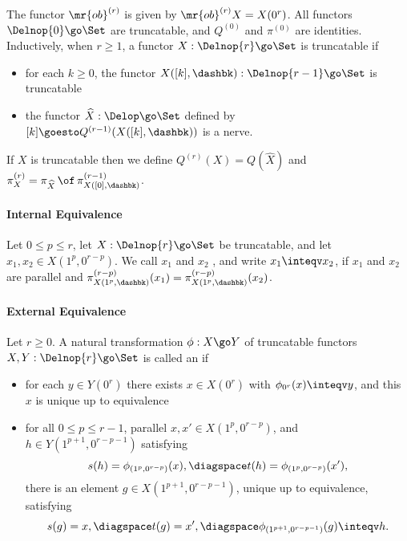The functor $\mr{ob}^{(r)}$ is given by $\mr{ob}^{(r)}X = X(0^r)$.  All
functors $\Delnop{0} \go \Set$ are truncatable, and $Q^{(0)}$ and
$\pi^{(0)}$ are identities.  Inductively, when $r\geq 1$, a functor $X:
\Delnop{r} \go \Set$ is truncatable if 
%
\begin{itemize}
\item for each $k\geq 0$, the functor $X([k],\dashbk): \Delnop{r-1} \go
\Set$ is truncatable 
\item the functor $\widehat{X}: \Delop \go \Set$ defined by $[k] \goesto
Q^{(r-1)}(X([k],\dashbk))$ is a nerve.
\end{itemize}
%
If $X$ is truncatable then we define $Q^{(r)}(X)=Q(\widehat{X})$ and
$\pi^{(r)}_X = \pi_{\widehat{X}} \,\of\, \pi^{(r-1)}_{X([0],\dashbk)}$.




\paragraph{Internal Equivalence}

Let $0\leq p\leq r$, let $X: \Delnop{r} \go \Set$ be truncatable, and let
$x_1,x_2 \in X(1^p, 0^{r-p})$.  We call $x_1$ and $x_2$ ,
and write $x_1\inteqv x_2$, if $x_1$ and $x_2$ are parallel and
$\pi^{(r-p)}_{X(1^p,\dashbk)}(x_1) = \pi^{(r-p)}_{X(1^p,\dashbk)}(x_2)$.

\paragraph{External Equivalence}

Let $r\geq 0$.  A natural transformation $\phi: X \go Y$ of truncatable
functors $X, Y: \Delnop{r} \go \Set$ is called an  if
%
\begin{itemize}
\item 
for each $y\in Y(0^r)$ there exists $x\in X(0^r)$ with $\phi_{0^r}(x)
\inteqv y$, and this $x$ is unique up to equivalence
\item
for all $0 \leq p\leq r-1$, parallel $x, x' \in X(1^p,0^{r-p})$, and $h\in
Y(1^{p+1},0^{r-p-1})$ satisfying
\[
s(h)=\phi_{(1^p,0^{r-p})}(x),	\diagspace 
t(h)=\phi_{(1^p,0^{r-p})}(x'),
\]
there is an element $g\in X(1^{p+1},0^{r-p-1})$, unique up to equivalence,
satisfying 
%
%
\[
s(g)=x, 		\diagspace
t(g)=x', 		\diagspace
\phi_{(1^{p+1},0^{r-p-1})}(g) \inteqv h.
\]
\end{itemize}




